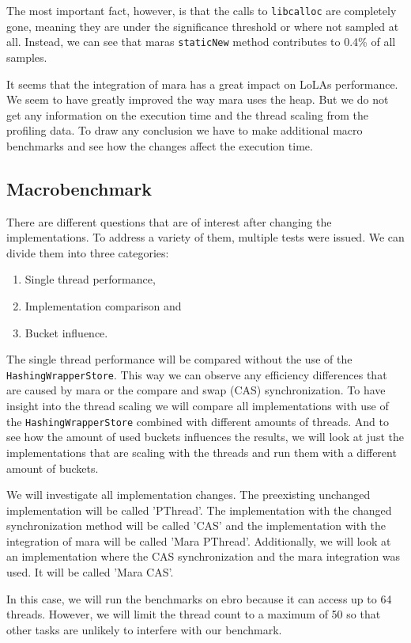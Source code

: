 The most important fact, however, is that the calls to \texttt{libcalloc} are completely gone, meaning they are under the significance threshold or where not sampled at all. Instead, we can see that maras \texttt{staticNew} method contributes to 0.4\% of all samples.

It seems that the integration of mara has a great impact on LoLAs performance. We seem to have greatly improved the way mara uses the heap. But we do not get any information on the execution time and the thread scaling from the profiling data. To draw any conclusion we have to make additional macro benchmarks and see how the changes affect the execution time.

\subsection{Macrobenchmark}

There are different questions that are of interest after changing the implementations. To address a variety of them, multiple tests were issued. We can divide them into three categories:
\begin{enumerate}
    \item Single thread performance,
    \item Implementation comparison and
    \item Bucket influence.
\end{enumerate}
The single thread performance will be compared without the use of the \texttt{Hashing\-Wrapper\-Store}. This way we can observe any efficiency differences that are caused by mara or the compare and swap (CAS) synchronization.
To have insight into the thread scaling we will compare all implementations with use of the \texttt{Hashing\-Wrapper\-Store} combined with different amounts of threads.
And to see how the amount of used buckets influences the results, we will look at just the implementations that are scaling with the threads and run them with a different amount of buckets.

We will investigate all implementation changes. The preexisting unchanged implementation will be called 'PThread'. The implementation with the changed synchronization method will be called 'CAS' and the implementation with the integration of mara will be called 'Mara PThread'. Additionally, we will look at an implementation where the CAS synchronization and the mara integration was used. It will be called 'Mara CAS'.

In this case, we will run the benchmarks on ebro because it can access up to 64 threads. However, we will limit the thread count to a maximum of 50 so that other tasks are unlikely to interfere with our benchmark.

